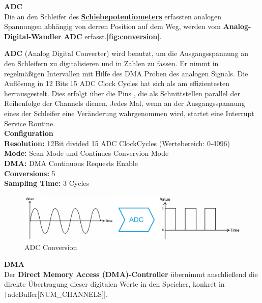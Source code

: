\textbf{\hypertarget{ADC}{ADC}} \\

Die an den Schleifer des \textbf{\hyperlink{Potentiometer}{Schiebepotentiometers}} erfassten analogen Spannungen abhängig von derren Position auf dem Weg, werden vom \textbf{Analog-Digital-Wandler} \textbf{\hyperlink{ADC}{ADC}} erfasst.\textbf{\autoref{fig:conversion}}. 

\textbf{ADC}\cite{adc} (Analog Digital Converter) wird benutzt, um die Ausgangsspannung an den Schleifern zu digitalisieren und in Zahlen zu fassen. Er nimmt in regelmäßigen Intervallen mit Hilfe des DMA Proben des analogen Signals. Die Auflösung in 12 Bits 15 ADC Clock Cycles hat sich als am effizientesten herrausgestelt.
Dies erfolgt über die Pins , die als Schnittstellen parallel der Reihenfolge der Channels  dienen. Jedes Mal, wenn an der Ausgangsspannung eines der Schleifer eine Veränderung wahrgenommen wird, startet eine Interrupt Service Routine.\\

\textbf{Configuration}\\

\textbf{Resolution:} 12Bit divided 15 ADC ClockCycles (Wertebereich: 0-4096) \\
\textbf{Mode:} Scan Mode und Continues Convervion Mode \\
\textbf{DMA:} DMA Continuous Requests Enable \\
\textbf{Conversions:} 5 \\
\textbf{Sampling Time:} 3 Cycles  \\

\begin{figure}[H]
	\centering
	\includegraphics[width=1.0\textwidth]{images/08_durchfuehrung/interface/Conversion.drawio.png}
	\caption{ADC Conversion}
	\label{fig:conversion}
\end{figure}

\textbf{\hypertarget{DMA}{DMA}} \\

Der \textbf{Direct Memory Access (DMA)-Controller} übernimmt anschließend die direkte Übertragung dieser digitalen Werte in den Speicher, konkret in  \texttt|adcBuffer[NUM_CHANNELS]|.

